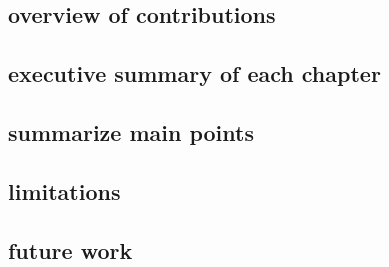 \subsection{overview of contributions}
\subsection{executive summary of each chapter}
\subsection{summarize main points}
\subsection{limitations}
\subsection{future work}
